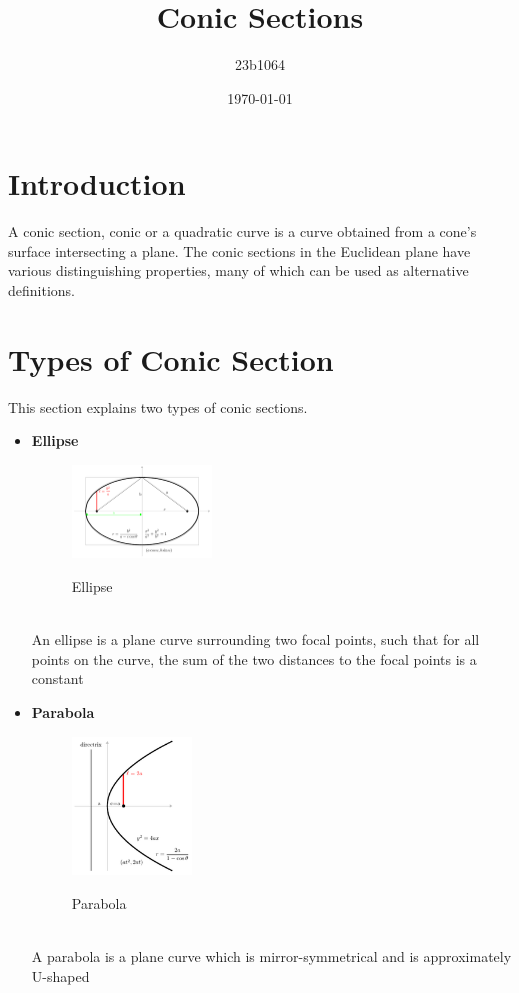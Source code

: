 \documentclass{article}
\title{Conic Sections}
\author{23b1064}
\date{\today}
\begin{document}
\maketitle
\tableofcontents
\clearpage

\section{Introduction}
A conic section, conic or a quadratic curve is a curve obtained from a cone’s surface intersecting a plane. The conic sections in the Euclidean plane have various distinguishing properties, many of which can be used as alternative definitions.
\section{Types of Conic Section}
This section explains two types of conic sections.
\begin{itemize}
	\item \textbf{Ellipse}\\
	\begin{figure}[h]
		\centering
		\includegraphics[width=0.35\textwidth]{Ellipse.png}
		\label{ellipse}
		\caption[short]{Ellipse}
	\end{figure}\\
	An ellipse is a plane curve surrounding two focal points, such that for all
	points on the curve, the sum of the two distances to the focal points is a
	constant
	\item \textbf{Parabola}\\
	\begin{figure}[h]
		\centering
		\includegraphics*[width=0.3\textwidth]{parabola.png}
		\label{parabola}
		\caption[short]{Parabola}
	\end{figure}\\
	A parabola is a plane curve which is mirror-symmetrical and is approximately U-shaped
\end{itemize}
\end{document}
